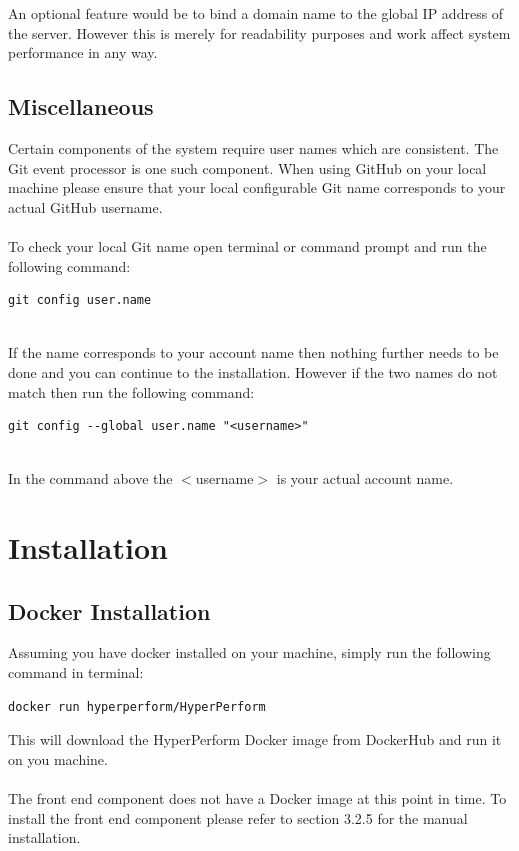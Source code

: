 \documentclass[11pt,a4paper]{article}
\begin{document}
An optional feature would be to bind a domain name to the global IP address of the server. However this is merely for readability purposes and work affect system performance in any way.

\subsection{Miscellaneous}

Certain components of the system require user names which are consistent. The Git event processor is one such component. When using GitHub on your local machine please ensure that your local configurable Git name corresponds to your actual GitHub username. \\ \\
To check your local Git name open terminal or command prompt and run the following command: 

\begin{lstlisting}
git config user.name
\end{lstlisting} 
~\\
If the name corresponds to your account name then nothing further needs to be done and you can continue to the installation. However if the two names do not match then run the following command:

\begin{lstlisting}
git config --global user.name "<username>"
\end{lstlisting}
~\\
In the command above the $<$username$>$ is your actual account name.

\section{Installation}

\subsection{Docker Installation}

Assuming you have docker installed on your machine, simply run the following command in terminal: 

\begin{lstlisting}[language=bash]
docker run hyperperform/HyperPerform 
\end{lstlisting}
This will download the HyperPerform Docker image from DockerHub and run it on you machine. \\ \\
The front end component does not have a Docker image at this point in time. To install the front end component please refer to section 3.2.5 for the manual installation.
\end{document}
